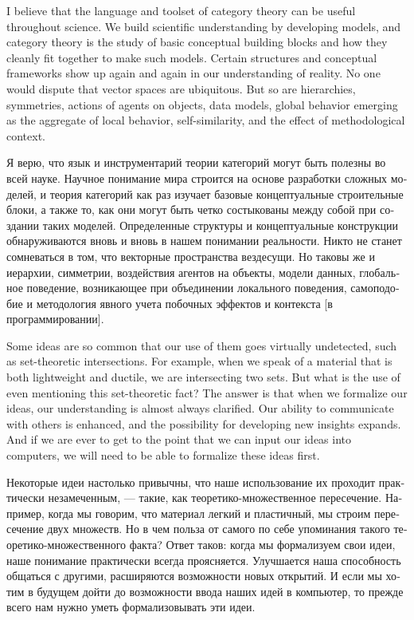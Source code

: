 \documentclass[a4paper]{book}
\theoremstyle{myth}
\begin{document}
\begin{russian}
I believe that the language and toolset of category theory can be useful throughout science. We build scientific understanding by developing models, and category theory is the study of basic conceptual building blocks and how they cleanly fit together to make such models. Certain structures and conceptual frameworks show up again and again in our understanding of reality. No one would dispute that vector spaces are ubiquitous. But so are hierarchies, symmetries, actions of agents on objects, data models, global behavior emerging as the aggregate of local behavior, self-similarity, and the effect of methodological context.

Я верю, что язык и инструментарий теории категорий могут быть полезны во всей науке. Научное понимание мира строится на основе разработки сложных моделей, и теория категорий как раз изучает базовые концептуальные строительные блоки, а также то, как они могут быть четко состыкованы между собой при создании таких моделей. Определенные структуры и концептуальные конструкции обнаруживаются вновь и вновь в нашем понимании реальности. Никто не станет сомневаться в том, что векторные пространства вездесущи. Но таковы же и иерархии, симметрии, воздействия агентов на объекты, модели данных, глобальное поведение, возникающее при объединении локального поведения, самоподобие и методология явного учета побочных эффектов и контекста [в программировании].

Some ideas are so common that our use of them goes virtually undetected, such as set-theoretic intersections. For example, when we speak of a material that is both lightweight and ductile, we are intersecting two sets. But what is the use of even mentioning this set-theoretic fact? The answer is that when we formalize our ideas, our understanding is almost always clarified. Our ability to communicate with others is enhanced, and the possibility for developing new insights expands. And if we are ever to get to the point that we can input our ideas into computers, we will need to be able to formalize these ideas first.

Некоторые идеи настолько привычны, что наше использование их проходит практически незамеченным, — такие, как теоретико-множественное пересечение. Например, когда мы говорим, что материал легкий и пластичный, мы строим пересечение двух множеств. Но в чем польза от самого по себе упоминания такого теоретико-множественного факта? Ответ таков: когда мы формализуем свои идеи, наше понимание практически всегда проясняется. Улучшается наша способность общаться с другими, расширяются возможности новых открытий. И если мы хотим в будущем дойти до возможности ввода наших идей в компьютер, то прежде всего нам нужно уметь формализовывать эти идеи. 


\end{russian}
\end{document}
